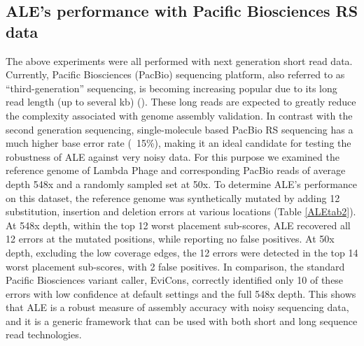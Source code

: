 \documentclass[phd,tocprelim]{cornell}
\begin{document}
\subsection{ALE’s performance with Pacific Biosciences RS data}
The above experiments were all performed with next generation short read data. Currently, Pacific Biosciences (PacBio) sequencing platform, also referred to as “third-generation” sequencing, is becoming increasing popular due to its long read length (up to several kb) (\cite{Eid2009}). These long reads are expected to greatly reduce the complexity associated with genome assembly validation. In contrast with the second generation sequencing, single-molecule based PacBio RS sequencing has a much higher base error rate (~15\%), making it an ideal candidate for testing the robustness of ALE against very noisy data. For this purpose we examined the reference genome of Lambda Phage and corresponding PacBio reads of average depth 548x and a randomly sampled set at 50x. To determine ALE’s performance on this dataset, the reference genome was synthetically mutated by adding 12 substitution, insertion and deletion errors at various locations (Table \ref{ALEtab2}). At 548x depth, within the top 12 worst placement sub-scores, ALE recovered all 12 errors at the mutated positions, while reporting no false positives. At 50x depth, excluding the low coverage edges, the 12 errors were detected in the top 14 worst placement sub-scores, with 2 false positives.  In comparison, the standard Pacific Biosciences variant caller, EviCons, correctly identified only 10 of these errors with low confidence at default settings and the full 548x depth. This shows that ALE is a robust measure of assembly accuracy with noisy sequencing data, and it is a generic framework that can be used with both short and long sequence read technologies.
\end{document}
